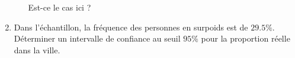 \begin{exercice}
\begin{enumerate}
\begin{enumerate}
                    Est-ce le cas ici ?
            \end{enumerate}
        \item
            Dans l'échantillon, la fréquence des personnes en surpoids est de \( 29.5\%\). Déterminer un intervalle de confiance au seuil \( 95\%\) pour la proportion réelle dans la ville.
            
    \end{enumerate}
    


\end{exercice}
